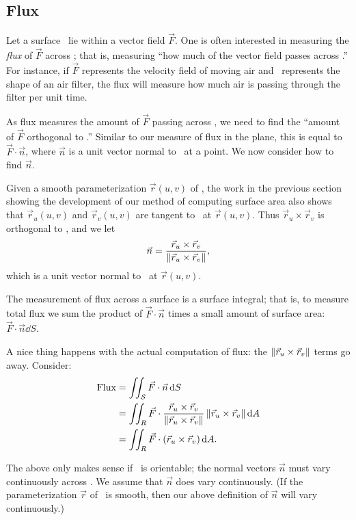\subsection{Flux}

Let a surface \surfaceS\ lie within a vector field $\vec F$. One is often interested in measuring the \emph{flux} of $\vec F$ across \surfaceS; that is, measuring ``how much of the vector field passes across \surfaceS.'' For instance, if $\vec F$ represents the velocity field of moving air and \surfaceS\ represents the shape of an air filter, the flux will measure how much air is passing through the filter per unit time.

As flux measures the amount of $\vec F$ passing across \surfaceS, we need to find the ``amount of $\vec F$ orthogonal to \surfaceS.'' Similar to our measure of flux in the plane, this is equal to $\vec F\cdot \vec n$, where $\vec n$ is a unit vector normal to \surfaceS\ at a point. We now consider how to find $\vec n$.

Given a smooth parameterization $\vec r(u,v)$ of \surfaceS, the work in the previous section showing the development of our method of computing surface area also shows that $\vec r_u(u,v)$ and $\vec r_v(u,v)$ are tangent to \surfaceS\ at $\vec r(u,v)$. Thus $\vec r_u\times \vec r_v$ is orthogonal to \surfaceS, and we let
\[\vec n = \frac{\vec r_u\times \vec r_v}{\left\lVert \vec r_u\times \vec r_v \right\rVert},\]
which is a unit vector normal to \surfaceS\ at $\vec r(u,v)$.

The measurement of flux across a surface is a surface integral; that is, to measure total flux we sum the product of $\vec F\cdot\vec n$ times a small amount of surface area: $\vec F\cdot \vec n\dd S$. 

A nice thing happens with the actual computation of flux: the $\left\lVert \vec r_u\times \vec r_v \right\rVert$ terms go away. Consider:
\begin{align*}
	\text{Flux}
	&= \iint_{\mathcal{S}} \vec F\cdot \vec n\operatorname{d}\! S \\
	&= \iint_R \vec F\cdot \frac{\vec r_u\times \vec r_v}{\left\lVert \vec r_u\times \vec r_v \right\rVert}\left\lVert \vec r_u\times \vec r_v \right\rVert\operatorname{d}\! A \\
	&= \iint_R \vec F\cdot (\vec r_u\times \vec r_v)\operatorname{d}\! A.
\end{align*}

The above only makes sense if \surfaceS\ is orientable; the normal vectors $\vec n$ must vary continuously across \surfaceS. We assume that $\vec n$ does vary continuously. (If the parameterization $\vec r$ of \surfaceS\ is smooth, then our above definition of $\vec n$ will vary continuously.)

